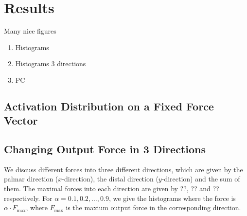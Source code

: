 \section{Results}
Many nice figures
\begin{enumerate}
	\item Histograms
	\item Histograms 3 directions
	\item PC
\end{enumerate}

\subsection{Activation Distribution on a  Fixed Force Vector}

\subsection{Changing Output Force in 3 Directions}
We discuss different forces into three different directions, which are given by the palmar direction ($x$-direction), the distal direction ($y$-direction) and the sum of them. The maximal forces into each direction are given by ??, ?? and ?? respectively. For $\alpha = 0.1, 0.2, \dots, 0.9$, we give the histograms where the force is $\alpha \cdot F_{\max}$, where $F_{\max}$ is the maxium output force in the corresponding direction. 